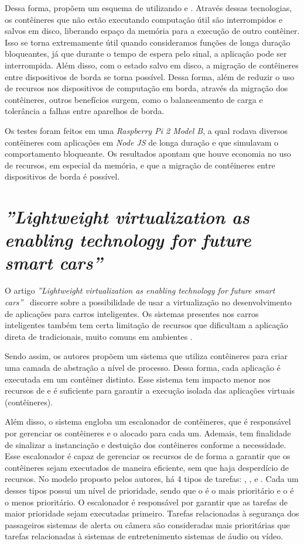 Dessa forma,  propõem um esquema de \checkpointing utilizando \docker e \criu. Através dessas tecnologias, os contêineres que não estão executando computação útil são interrompidos e salvos em disco, liberando espaço da memória para a execução de outro contêiner. Isso se torna extremamente útil quando consideramos funções de longa duração bloqueantes, já que durante o tempo de espera pelo sinal, a aplicação pode ser interrompida. Além disso, com o estado salvo em disco, a migração de contêineres entre dispositivos \iot de borda se torna possível. Dessa forma, além de reduzir o uso de recursos nos dispositivos de computação em borda, através da migração dos contêineres, outros benefícios surgem, como o balanceamento de carga e tolerância a falhas entre aparelhos \iot de borda.

Os testes foram feitos em uma \textit{Raspberry Pi 2 Model B}, a qual rodava diversos contêineres com aplicações em \textit{Node JS} de longa duração e que simulavam o comportamento bloqueante. Os resultados apontam que houve economia no uso de recursos, em especial da memória, e que a migração de contêineres entre dispositivos \iot de borda é possível.

\section{ \textit{''Lightweight virtualization as enabling technology for future smart cars''}}

O artigo \textit{''Lightweight virtualization as enabling technology for future smart cars''}~\cite{smartcarslwvirtualization} discorre sobre a possibilidade de usar a virtualização no desenvolvimento de aplicações para carros inteligentes. Os sistemas presentes nos carros inteligentes também tem certa limitação de recursos que dificultam a aplicação direta de \hypervisors tradicionais, muito comuns em ambientes \cloud.

Sendo assim, os autores propõem um sistema que utiliza contêineres \docker para criar uma camada de abstração a nível de processo. Dessa forma, cada aplicação é executada em um contêiner distinto. Esse sistema tem impacto menor nos recursos de \hardware e é suficiente para garantir a execução isolada das aplicações virtuais (contêineres).

Além disso, o sistema engloba um escalonador de contêineres, que é responsável por gerenciar os contêineres e o \hardware alocado para cada um. Ademais, tem finalidade de sinalizar a instanciação e destuição dos contêineres conforme a necessidade. Esse escalonador é capaz de gerenciar os recursos de \hardware de forma a garantir que os contêineres sejam executados de maneira eficiente, sem que haja desperdício de recursos. No modelo proposto pelos autores, há 4 tipos de tarefas: \critical, \high, \moderate e \low. Cada um desses tipos possui um nível de prioridade, sendo que o \critical é o mais prioritário e o \low é o menos prioritário. O escalonador é responsável por garantir que as tarefas de maior prioridade sejam executadas primeiro. Tarefas relacionadas à segurança dos passageiros \eg sistemas de alerta ou câmera são consideradas mais prioritárias que tarefas relacionadas à sistemas de entretenimento \eg sistemas de áudio ou vídeo.

